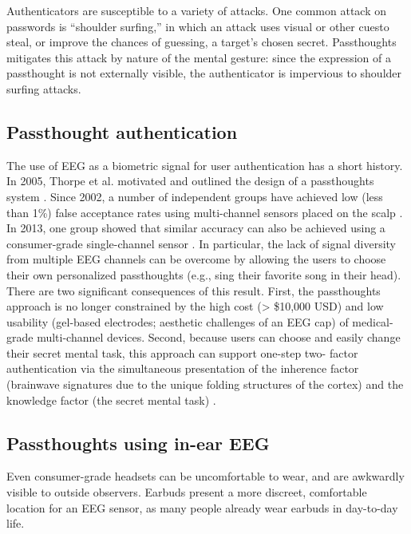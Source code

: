 \documentclass[sigconf]{acmart}
\begin{document}
Authenticators are susceptible to a variety of attacks. 
One common attack on passwords is ``shoulder surfing,'' in which an attack uses visual or other cuesto steal, or improve the chances of guessing, a target's chosen secret. 
Passthoughts mitigates this attack by nature of the mental gesture:
since the expression of a passthought is not externally visible, the authenticator is impervious to shoulder surfing attacks.

\subsection{Passthought authentication}
\label{sec:org9645597}

The use of EEG as a biometric signal for user authentication has a short history.
In 2005, Thorpe et al. motivated and outlined the design of a passthoughts system \cite{Thorpe2005}. Since 2002, a number of independent groups have achieved low (less than 1\%) false acceptance rates using multi-channel sensors placed on the scalp \cite{Poulos2002,Marcel2007a,Palaniappan2008,Ashby2011}.
In 2013, one group showed that similar accuracy can also be
achieved using a consumer-grade single-channel sensor \cite{Chuang2013b}. 
In particular, the lack of signal diversity from multiple EEG channels can be overcome by allowing
the users to choose their own personalized passthoughts (e.g., sing their favorite
song in their head). There are two significant consequences of this result. First,
the passthoughts approach is no longer constrained by the high cost (> \$10,000 USD)
and low usability (gel-based electrodes; aesthetic challenges of an EEG cap) of
medical-grade multi-channel devices. Second, because users can choose and
easily change their secret mental task, this approach can support one-step two-
factor authentication via the simultaneous presentation of the inherence factor
(brainwave signatures due to the unique folding structures of the cortex) and the
knowledge factor (the secret mental task) \cite{Chuang2014}.

\subsection{Passthoughts using in-ear EEG}
\label{sec:orgfd91d74}

Even consumer-grade headsets can be uncomfortable to wear, and are awkwardly visible to outside observers. Earbuds present a more discreet, comfortable location for an EEG sensor, as many people already wear earbuds in day-to-day life.
\end{document}
